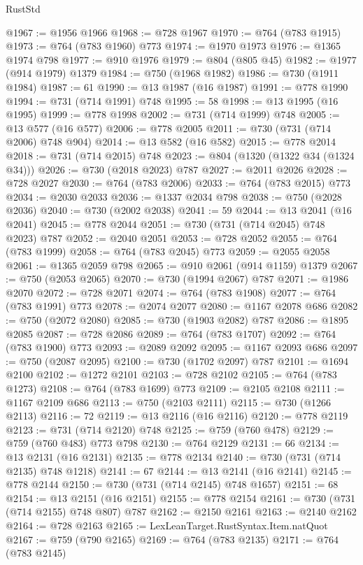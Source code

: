 \begin{lexlean}{RustStd}
\begin{coremodule}
@1967 := @1956 @1966
@1968 := @728 @1967
@1970 := @764 (@783 @1915)
@1973 := @764 (@783 @1960) @773
@1974 := @1970 @1973
@1976 := @1365 @1974 @798
@1977 := @910 @1976
@1979 := @804 (@805 @45)
@1982 := @1977 (@914 @1979) @1379
@1984 := @750 (@1968 @1982)
@1986 := @730 (@1911 @1984)
@1987 := 61
@1990 := @13 @1987 (@16 @1987)
@1991 := @778 @1990
@1994 := @731 (@714 @1991) @748
@1995 := 58
@1998 := @13 @1995 (@16 @1995)
@1999 := @778 @1998
@2002 := @731 (@714 @1999) @748
@2005 := @13 @577 (@16 @577)
@2006 := @778 @2005
@2011 := @730 (@731 (@714 @2006) @748 @904)
@2014 := @13 @582 (@16 @582)
@2015 := @778 @2014
@2018 := @731 (@714 @2015) @748
@2023 := @804 (@1320 (@1322 @34 (@1324 @34)))
@2026 := @730 (@2018 @2023) @787
@2027 := @2011 @2026
@2028 := @728 @2027
@2030 := @764 (@783 @2006)
@2033 := @764 (@783 @2015) @773
@2034 := @2030 @2033
@2036 := @1337 @2034 @798
@2038 := @750 (@2028 @2036)
@2040 := @730 (@2002 @2038)
@2041 := 59
@2044 := @13 @2041 (@16 @2041)
@2045 := @778 @2044
@2051 := @730 (@731 (@714 @2045) @748 @2023) @787
@2052 := @2040 @2051
@2053 := @728 @2052
@2055 := @764 (@783 @1999)
@2058 := @764 (@783 @2045) @773
@2059 := @2055 @2058
@2061 := @1365 @2059 @798
@2065 := @910 @2061 (@914 @1159) @1379
@2067 := @750 (@2053 @2065)
@2070 := @730 (@1994 @2067) @787
@2071 := @1986 @2070
@2072 := @728 @2071
@2074 := @764 (@783 @1908)
@2077 := @764 (@783 @1991) @773
@2078 := @2074 @2077
@2080 := @1167 @2078 @686
@2082 := @750 (@2072 @2080)
@2085 := @730 (@1903 @2082) @787
@2086 := @1895 @2085
@2087 := @728 @2086
@2089 := @764 (@783 @1707)
@2092 := @764 (@783 @1900) @773
@2093 := @2089 @2092
@2095 := @1167 @2093 @686
@2097 := @750 (@2087 @2095)
@2100 := @730 (@1702 @2097) @787
@2101 := @1694 @2100
@2102 := @1272 @2101
@2103 := @728 @2102
@2105 := @764 (@783 @1273)
@2108 := @764 (@783 @1699) @773
@2109 := @2105 @2108
@2111 := @1167 @2109 @686
@2113 := @750 (@2103 @2111)
@2115 := @730 (@1266 @2113)
@2116 := 72
@2119 := @13 @2116 (@16 @2116)
@2120 := @778 @2119
@2123 := @731 (@714 @2120) @748
@2125 := @759 (@760 @478)
@2129 := @759 (@760 @483) @773 @798
@2130 := @764 @2129
@2131 := 66
@2134 := @13 @2131 (@16 @2131)
@2135 := @778 @2134
@2140 := @730 (@731 (@714 @2135) @748 @1218)
@2141 := 67
@2144 := @13 @2141 (@16 @2141)
@2145 := @778 @2144
@2150 := @730 (@731 (@714 @2145) @748 @1657)
@2151 := 68
@2154 := @13 @2151 (@16 @2151)
@2155 := @778 @2154
@2161 := @730 (@731 (@714 @2155) @748 @807) @787
@2162 := @2150 @2161
@2163 := @2140 @2162
@2164 := @728 @2163
@2165 := LexLeanTarget.RustSyntax.Item.natQuot
@2167 := @759 (@790 @2165)
@2169 := @764 (@783 @2135)
@2171 := @764 (@783 @2145)

\end{coremodule}
\end{lexlean}
